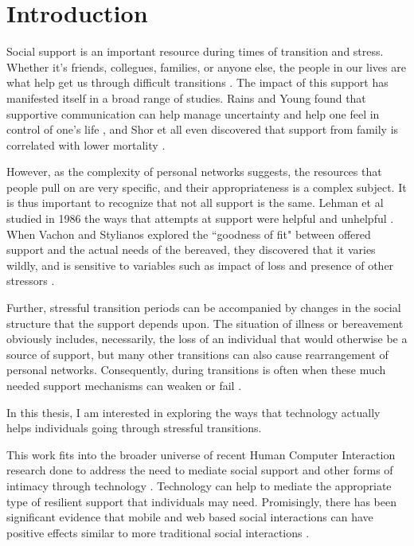 \chapter{Introduction}
  Social support is an important resource during times of transition and stress.
  Whether it's friends, collegues, families, or anyone else, the people in our lives
  are what help get us through difficult transitions \cite{mikal13}.
  The impact of this support has manifested itself in a broad range of studies.
  Rains and Young found that supportive communication can help manage uncertainty and
  help one feel in control of one's life \cite{rains09},
  and Shor et all even discovered that support from
  family is correlated with lower mortality \cite{shor13}.

  However, as the complexity of personal networks suggests, the resources that people pull on
  are very specific,
  and their appropriateness is a complex subject.
  It is thus important to recognize that not all support is the same.
  Lehman et al studied in 1986 the ways that attempts at support were helpful and unhelpful
  \cite{lehman86}.
  When Vachon and Stylianos explored the ``goodness of fit" between offered support and the actual needs of
  the bereaved, they discovered that it varies wildly, and is sensitive to variables such as impact of loss
  and presence of other stressors
  \cite{vachon88}.
  
  Further, stressful transition periods can be accompanied by changes in the social structure
  that the support depends upon.
  The situation of illness or bereavement obviously includes, necessarily,
  the loss of an individual that would otherwise be a source of support,
  but many other transitions can also cause rearrangement of personal networks.
  Consequently, during transitions is often when these much needed
  support mechanisms can weaken or fail
  \cite{mikal13}.

  In this thesis, I am interested in exploring
  the ways that technology actually helps individuals going
  through stressful transitions.

  This work fits into the broader universe of
  recent Human Computer Interaction research
  done to address the need to mediate social support
  and other forms of intimacy through technology
  \cite{hassenzhal12}.
  Technology can help to mediate the appropriate type of resilient support
  that individuals may need.
  Promisingly, there has been significant evidence that
  mobile and web based social interactions can have positive effects similar
  to more traditional social interactions
  \cite{shaw02, hjo14}.

